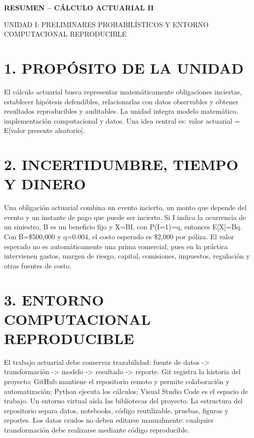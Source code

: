 \documentclass[11pt]{article}
\begin{document}
\begin{center}

\Large\textbf{RESUMEN – CÁLCULO ACTUARIAL II}

\end{center}



UNIDAD I: PRELIMINARES PROBABILÍSTICOS Y ENTORNO COMPUTACIONAL REPRODUCIBLE

\section*{1. PROPÓSITO DE LA UNIDAD}

El cálculo actuarial busca representar matemáticamente obligaciones inciertas, establecer hipótesis defendibles, relacionarlas con datos observables y obtener resultados reproducibles y auditables. La unidad integra modelo matemático, implementación computacional y datos. Una idea central es: valor actuarial = E[valor presente aleatorio].

\section*{2. INCERTIDUMBRE, TIEMPO Y DINERO}

Una obligación actuarial combina un evento incierto, un monto que depende del evento y un instante de pago que puede ser incierto. Si I indica la ocurrencia de un siniestro, B es un beneficio fijo y X=BI, con P(I=1)=q, entonces E[X]=Bq. Con B=\$500,000 y q=0.004, el costo esperado es \$2,000 por póliza. El valor esperado no es automáticamente una prima comercial, pues en la práctica intervienen gastos, margen de riesgo, capital, comisiones, impuestos, regulación y otras fuentes de costo.

\section*{3. ENTORNO COMPUTACIONAL REPRODUCIBLE}

El trabajo actuarial debe conservar trazabilidad: fuente de datos -> transformación -> modelo -> resultado -> reporte. Git registra la historia del proyecto; GitHub mantiene el repositorio remoto y permite colaboración y automatización; Python ejecuta los cálculos; Visual Studio Code es el espacio de trabajo. Un entorno virtual aísla las bibliotecas del proyecto. La estructura del repositorio separa datos, notebooks, código reutilizable, pruebas, figuras y reportes. Los datos crudos no deben editarse manualmente: cualquier transformación debe realizarse mediante código reproducible.
\end{document}
